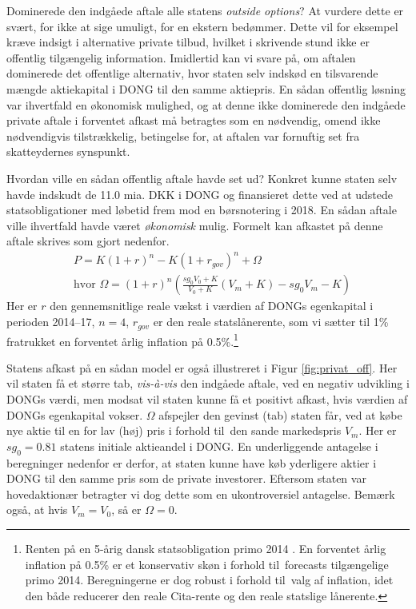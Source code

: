 \documentclass{article}
\begin{document}
Dominerede den indgåede aftale alle statens \emph{outside options}? At vurdere dette er svært, for ikke at sige umuligt, for en ekstern bedømmer. Dette vil for eksempel kræve indsigt i alternative private tilbud, hvilket i skrivende stund ikke er offentlig tilgængelig information. Imidlertid kan vi svare på, om aftalen dominerede det offentlige alternativ, hvor staten selv indskød en tilsvarende mængde aktiekapital i DONG til den samme aktiepris. En sådan offentlig løsning var ihvertfald en økonomisk mulighed, og at denne ikke dominerede den indgåede private aftale i forventet afkast må betragtes som en nødvendig, omend ikke nødvendigvis tilstrækkelig, betingelse for, at aftalen var fornuftig set fra skatteydernes synspunkt. 

Hvordan ville en sådan offentlig aftale havde set ud? Konkret kunne staten selv havde indskudt de 11.0 mia. DKK i DONG og finansieret dette ved at udstede statsobligationer med løbetid frem mod en børsnotering i 2018. En sådan aftale ville ihvertfald havde været \emph{økonomisk} mulig. Formelt kan afkastet på denne aftale skrives som gjort nedenfor. 
\begin{align}
&P=K(1+r)^n-K(1+r_{gov})^n +\Omega \\
&\text{hvor } \Omega=(1+r)^n\left( \frac{sg_0 V_0+K}{V_0+K} \left( V_m+K \right)-sg_0 V_m -K\right)\nonumber
\label{eq:gov_capital}
\end{align}
Her er $r$ den gennemsnitlige reale vækst i værdien af DONGs egenkapital i perioden 2014--17, $n=4$, $r_{\mathit{gov}}$ er den reale statslånerente, som vi sætter til 1\% fratrukket en forventet årlig inflation på 0.5\%.\footnote{Renten på en 5-årig dansk statsobligation primo 2014 \citep{NB2014}. En forventet årlig inflation på 0.5\% er et konservativ skøn i forhold til\ forecasts tilgængelige primo 2014. Beregningerne er dog robust i forhold til\ valg af inflation, idet den både reducerer den reale Cita-rente og den reale statslige lånerente.}

Statens afkast på en sådan model er også illustreret i Figur \ref{fig:privat_off}. Her vil staten få et større tab, \emph{vis-\`{a}-vis} den indgåede aftale, ved en negativ udvikling i DONGs værdi, men modsat vil staten kunne få et positivt afkast, hvis værdien af DONGs egenkapital vokser. $\Omega$ afspejler den gevinst (tab) staten får, ved at købe nye aktie til en for lav (høj) pris i forhold til\ den sande markedspris $V_m$. Her er $sg_0=0.81$ statens initiale aktieandel i DONG. En underliggende antagelse i beregninger nedenfor er derfor, at staten kunne have køb yderligere aktier i DONG til den samme pris som de private investorer. Eftersom staten var hovedaktionær betragter vi dog dette som en ukontroversiel antagelse. Bemærk også, at hvis $V_m=V_0$, så er $\Omega=0$.
\end{document}
